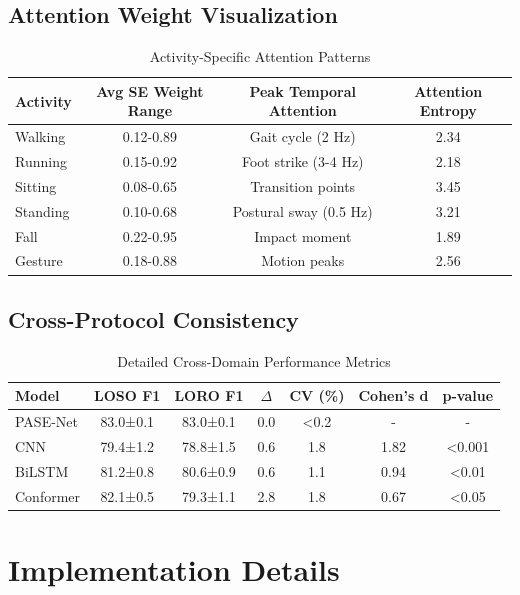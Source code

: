 \documentclass[10pt,a4paper]{article}
\begin{document}
\subsection{Attention Weight Visualization}

\begin{table}[h!]
\centering
\caption{Activity-Specific Attention Patterns}
\begin{tabular}{lccc}
\toprule
\textbf{Activity} & \textbf{Avg SE Weight Range} & \textbf{Peak Temporal Attention} & \textbf{Attention Entropy} \\
\midrule
Walking & 0.12-0.89 & Gait cycle (2 Hz) & 2.34 \\
Running & 0.15-0.92 & Foot strike (3-4 Hz) & 2.18 \\
Sitting & 0.08-0.65 & Transition points & 3.45 \\
Standing & 0.10-0.68 & Postural sway (0.5 Hz) & 3.21 \\
Fall & 0.22-0.95 & Impact moment & 1.89 \\
Gesture & 0.18-0.88 & Motion peaks & 2.56 \\
\bottomrule
\end{tabular}
\end{table}

\subsection{Cross-Protocol Consistency}

\begin{table}[h!]
\centering
\caption{Detailed Cross-Domain Performance Metrics}
\begin{tabular}{lcccccc}
\toprule
\textbf{Model} & \textbf{LOSO F1} & \textbf{LORO F1} & \textbf{$\Delta$} & \textbf{CV (\%)} & \textbf{Cohen's d} & \textbf{p-value} \\
\midrule
PASE-Net & 83.0±0.1 & 83.0±0.1 & 0.0 & <0.2 & - & - \\
CNN & 79.4±1.2 & 78.8±1.5 & 0.6 & 1.8 & 1.82 & <0.001 \\
BiLSTM & 81.2±0.8 & 80.6±0.9 & 0.6 & 1.1 & 0.94 & <0.01 \\
Conformer & 82.1±0.5 & 79.3±1.1 & 2.8 & 1.8 & 0.67 & <0.05 \\
\bottomrule
\end{tabular}
\end{table}

\section{Implementation Details}
\end{document}
